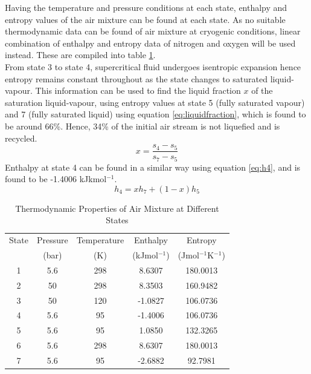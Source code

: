 \documentclass[11pt,oneside]{article}
\begin{document}
        \noindent Having the temperature and pressure conditions at each state, enthalpy and entropy values of the air mixture can be found at each state. As no suitable thermodynamic data can be found of air mixture at cryogenic conditions, linear combination of enthalpy and entropy data of nitrogen and oxygen will be used instead. These are compiled into table \ref{table:air_thermodata}. \\
        From state 3 to state 4, supercritical fluid undergoes isentropic expansion hence entropy remains constant throughout as the state changes to saturated liquid-vapour. This information can be used to find the liquid fraction $x$ of the saturation liquid-vapour, using entropy values at state 5 (fully saturated vapour) and 7 (fully saturated liquid) using equation \ref{eq:liquidfraction}, which is found to be around 66\%. Hence, 34\% of the initial air stream is not liquefied and is recycled.
        \begin{equation}
            x = \frac{s_4 - s_5}{s_7 - s_5}
            \label{eq:liquidfraction}
        \end{equation}
        Enthalpy at state 4 can be found in a similar way using equation \ref{eq:h4}, and is found to be -1.4006 kJkmol$^{-1}$.
        \begin{equation}
            h_4 = xh_7+(1-x)h_5
            \label{eq:h4}
        \end{equation}
        \begin{table}[H]
            \singlespacing
        	\centering
    	    \caption{Thermodynamic Properties of Air Mixture at Different States \citep{nist}}
    	    \label{table:air_thermodata}
    	    \begin{tabular}{|c|cc|cc|}
    	    \hline
    	    State   & Pressure  & Temperature   & Enthalpy  & Entropy \\
    	            & (bar)     & (K)           & (kJmol$^{-1}$) & (Jmol$^{-1}$K$^{-1}$) \\
    	    \hline
    	    1       & 5.6       & 298           & 8.6307    & 180.0013 \\
    	    2       & 50        & 298           & 8.3503    & 160.9482 \\
    	    3       & 50        & 120           & -1.0827   & 106.0736 \\
    	    4       & 5.6       & 95            & -1.4006   & 106.0736 \\
    	    5       & 5.6       & 95            & 1.0850    & 132.3265 \\
    	    6       & 5.6       & 298           & 8.6307    & 180.0013 \\
    	    7       & 5.6       & 95            & -2.6882   & 92.7981 \\    \hline
    	    \end{tabular}
    	    
        \end{table}
\end{document}
